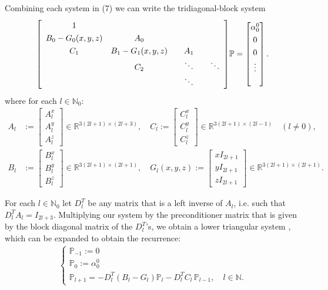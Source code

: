 \documentclass[11pt, oneside]{article}   	%
\newcommand{\R}{\mathbb{R}}
\newcommand{\N}{\mathbb{N}}
\newcommand{\No}{\mathbb{N}_0}
\newcommand{\bigP}{\mathbb{P}}
\newcommand{\Pl}{\mathbb{P}_l}
\newcommand{\Dlt}{D^T_l}
\begin{document}
Combining each system in (7) we can write the tridiagonal-block system
\begin{align}
\renewcommand\arraystretch{1.3}
\mleft[
\begin{array}{cccc}
		1  & & & \\
		B_0-G_0(x,y,z) & A_0 & & \\
		C_1 & B_1-G_1(x,y,z) & \quad A_1 \quad & \\
		& C_2 & \ddots & \ddots \\
		& & \ddots &
\end{array}
\mright]
\bigP
=
\begin{bmatrix}
	\alpha^0_0 \\ 0 \\ 0 \\ \vdots \\ \\
\end{bmatrix}.
\end{align}
where for each \(l \in \No\):
\begin{align}
A_l &:= \begin{bmatrix}
		A^x_l \\
		A^y_l \\
		A^z_l
	    \end{bmatrix} \in \R^{3(2l+1)\times(2l+3)}, \quad
C_l := \begin{bmatrix}
		C^x_l \\
		C^y_l \\
		C^z_l
	    \end{bmatrix} \in \R^{3(2l+1)\times(2l-1)} \quad (l \ne 0), \\
B_l &:= \begin{bmatrix}
		B^x_l \\
		B^y_l \\
		B^z_l
	    \end{bmatrix} \in \R^{3(2l+1)\times(2l+1)}, \quad
G_l(x,y,z) := \begin{bmatrix}
		xI_{2l+1} \\
		yI_{2l+1} \\
		zI_{2l+1}
	    \end{bmatrix} \in \R^{3(2l+1)\times(2l+1)}.
\end{align}

For each \(l \in \No\) let \(\Dlt\) be any matrix that is a left inverse of \(A_l\), i.e. such that \(\Dlt A_l = I_{2l+3}\). Multiplying our system by the preconditioner matrix that is given by the block diagonal matrix of the \(\Dlt\)'s, we obtain a lower triangular system \citep{dunkl2014orthogonal}, which can be expanded to obtain the recurrence:
\begin{align}
\begin{cases}
\bigP_{-1} := 0 \\
\bigP_{0} := \alpha^0_0 \\
\bigP_{l+1} = -\Dlt (B_l-G_l) \Pl - \Dlt C_l  \,\bigP_{l-1}, \quad l \in \N.
\end{cases}
\end{align}
\end{document}
